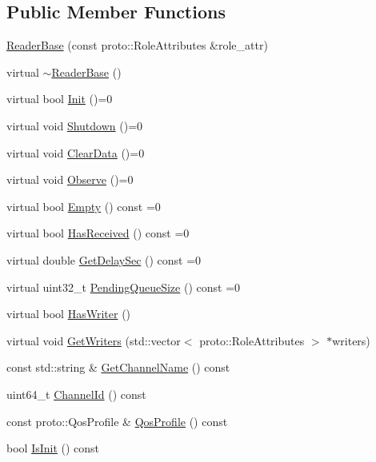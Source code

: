 \subsection*{Public Member Functions}
\begin{DoxyCompactItemize}
\item 
\hyperlink{classapollo_1_1cyber_1_1ReaderBase_a9f7a08c0ec4ad3d007efd2b8673312fc}{Reader\-Base} (const proto\-::\-Role\-Attributes \&role\-\_\-attr)
\item 
virtual \hyperlink{classapollo_1_1cyber_1_1ReaderBase_a5c38479c30457a5d6509735404a5d2f3}{$\sim$\-Reader\-Base} ()
\item 
virtual bool \hyperlink{classapollo_1_1cyber_1_1ReaderBase_a58e95863a3ea4e744ddff5914456ad7d}{Init} ()=0
\item 
virtual void \hyperlink{classapollo_1_1cyber_1_1ReaderBase_a340d56ab095e4ee0789e9ae6c3097730}{Shutdown} ()=0
\item 
virtual void \hyperlink{classapollo_1_1cyber_1_1ReaderBase_a6bf09eafd9a155192d6e623f90c881e0}{Clear\-Data} ()=0
\item 
virtual void \hyperlink{classapollo_1_1cyber_1_1ReaderBase_a3cfeb975a301fe9094221f105d387e55}{Observe} ()=0
\item 
virtual bool \hyperlink{classapollo_1_1cyber_1_1ReaderBase_a9f70abd4ac366a0e173f210db1512ffc}{Empty} () const =0
\item 
virtual bool \hyperlink{classapollo_1_1cyber_1_1ReaderBase_a42a2e0a6c898cc3da881b1531a608995}{Has\-Received} () const =0
\item 
virtual double \hyperlink{classapollo_1_1cyber_1_1ReaderBase_abaf2320e67f5845ecef3b1b3f561b3e5}{Get\-Delay\-Sec} () const =0
\item 
virtual uint32\-\_\-t \hyperlink{classapollo_1_1cyber_1_1ReaderBase_aff558a596e4f289b6a5fbb52e9d69fe6}{Pending\-Queue\-Size} () const =0
\item 
virtual bool \hyperlink{classapollo_1_1cyber_1_1ReaderBase_a0b5792a3fbab13927087c259bf848ab1}{Has\-Writer} ()
\item 
virtual void \hyperlink{classapollo_1_1cyber_1_1ReaderBase_a5f3ff80c03b0353a607c703461f591f8}{Get\-Writers} (std\-::vector$<$ proto\-::\-Role\-Attributes $>$ $\ast$writers)
\item 
const std\-::string \& \hyperlink{classapollo_1_1cyber_1_1ReaderBase_ac41daf5e2aa167f52b5ded5d8bb38e0b}{Get\-Channel\-Name} () const 
\item 
uint64\-\_\-t \hyperlink{classapollo_1_1cyber_1_1ReaderBase_a5f0ebff207b12283c72280454d4a394c}{Channel\-Id} () const 
\item 
const proto\-::\-Qos\-Profile \& \hyperlink{classapollo_1_1cyber_1_1ReaderBase_af2980f9f85084d4a3711b86d4cb24183}{Qos\-Profile} () const 
\item 
bool \hyperlink{classapollo_1_1cyber_1_1ReaderBase_a84bce8de3776b33f9ccd961f6b99dc60}{Is\-Init} () const 
\end{DoxyCompactItemize}
